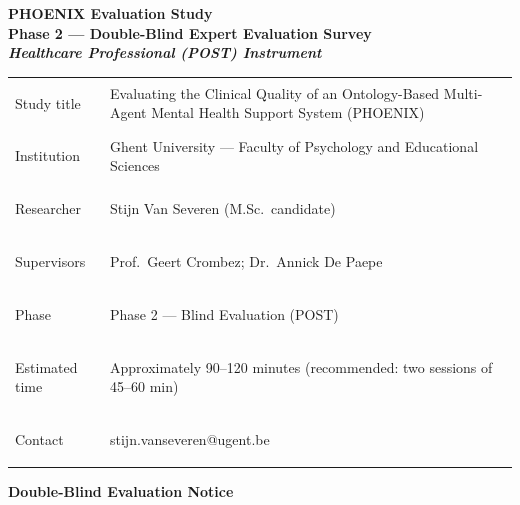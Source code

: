 \documentclass[11pt,a4paper]{article}
\renewcommand{\arraystretch}{1.30}
\begin{document}
\begin{titlepage}
\centering\vspace*{0.8cm}

\begin{tcolorbox}[
  colback=DarkBlue,colframe=DarkBlue,
  arc=3mm,left=14pt,right=14pt,top=12pt,bottom=12pt,
  width=\textwidth
]
\centering
{\fontsize{22}{28}\selectfont\bfseries\color{white}
PHOENIX Evaluation Study\\[0.3em]
\fontsize{15}{20}\selectfont\color{AccentBlue}
Phase 2 --- Double-Blind Expert Evaluation Survey\\[0.2em]
\fontsize{12}{16}\selectfont\color{white}
\textit{Healthcare Professional (POST) Instrument}
}
\end{tcolorbox}

\vspace{0.9cm}

\begin{tcolorbox}[
  colback=SoftBG,colframe=BorderGrey,
  arc=2mm,left=10pt,right=10pt,top=9pt,bottom=9pt,
  width=0.90\textwidth
]
\small\renewcommand{\arraystretch}{1.30}
\begin{tabularx}{\textwidth}{@{}>{\bfseries\raggedright}p{}X@{}}
Study title   & Evaluating the Clinical Quality of an Ontology-Based Multi-Agent Mental Health Support System (PHOENIX) \\
Institution   & Ghent University --- Faculty of Psychology and Educational Sciences \\
Researcher    & Stijn Van Severen (M.Sc.\ candidate) \\
Supervisors   & Prof.\ Geert Crombez; Dr.\ Annick De Paepe \\
Phase         & Phase 2 --- Blind Evaluation (POST) \\
Estimated time & Approximately 90--120 minutes (recommended: two sessions of 45--60 min) \\
Contact       & stijn.vanseveren@ugent.be \\
\end{tabularx}
\end{tcolorbox}

\vspace{0.7cm}

\begin{tcolorbox}[
  colback=AccentRed,colframe=RichPurple,
  arc=2mm,left=10pt,right=10pt,top=9pt,bottom=9pt,
  width=0.88\textwidth
]
\textbf{\color{RichPurple}\large Double-Blind Evaluation Notice}


\end{tcolorbox}
\end{titlepage}
\end{document}
